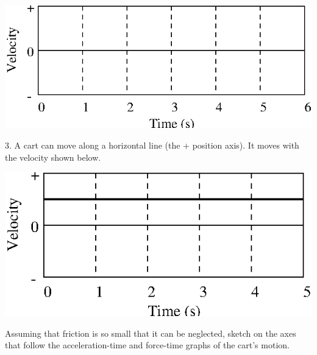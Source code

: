 \vspace{0.3cm}
{\par\centering \includegraphics{force1_fig7.eps} \par}
\vspace{0.3cm}

3. A cart can move along a horizontal line (the + position axis). It moves with
the velocity shown below.

\vspace{0.3cm}
{\par\centering \includegraphics{force1_fig8.eps} \par}
\vspace{0.3cm}

Assuming that friction is so small that it can be neglected, sketch on the axes
that follow the acceleration-time and force-time graphs of the cart's motion.

